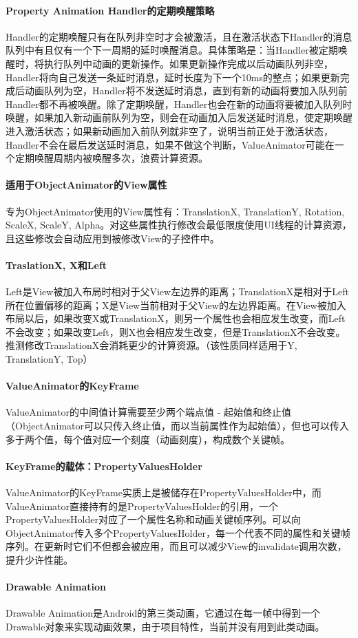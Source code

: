 \documentclass[UTF8]{ctexart}
\begin{document}
    \paragraph{Property Animation Handler的定期唤醒策略}
    Handler的定期唤醒只有在队列非空时才会被激活，且在激活状态下Handler的消息队列中有且仅有一个下一周期的延时唤醒消息。具体策略是：当Handler被定期唤醒时，将执行队列中动画的更新操作。如果更新操作完成以后动画队列非空，Handler将向自己发送一条延时消息，延时长度为下一个10ms的整点；如果更新完成后动画队列为空，Handler将不发送延时消息，直到有新的动画将要加入队列前Handler都不再被唤醒。除了定期唤醒，Handler也会在新的动画将要被加入队列时唤醒，如果加入新动画前队列为空，则会在动画加入后发送延时消息，使定期唤醒进入激活状态；如果新动画加入前队列就非空了，说明当前正处于激活状态，Handler不会在最后发送延时消息，如果不做这个判断，ValueAnimator可能在一个定期唤醒周期内被唤醒多次，浪费计算资源。
    \paragraph{适用于ObjectAnimator的View属性}
    专为ObjectAnimator使用的View属性有：TranslationX, TranslationY, Rotation, ScaleX, ScaleY, Alpha。对这些属性执行修改会最低限度使用UI线程的计算资源，且这些修改会自动应用到被修改View的子控件中。
    \paragraph{TraslationX, X和Left}
    Left是View被加入布局时相对于父View左边界的距离；TranslationX是相对于Left所在位置偏移的距离；X是View当前相对于父View的左边界距离。在View被加入布局以后，如果改变X或TranslationX，则另一个属性也会相应发生改变，而Left不会改变；如果改变Left，则X也会相应发生改变，但是TranslationX不会改变。推测修改TranslationX会消耗更少的计算资源。（该性质同样适用于Y, TranslationY, Top）
    \paragraph{ValueAnimator的KeyFrame}
    ValueAnimator的中间值计算需要至少两个端点值 - 起始值和终止值（ObjectAnimator可以只传入终止值，而以当前属性作为起始值），但也可以传入多于两个值，每个值对应一个刻度（动画刻度），构成数个关键帧。
    \paragraph{KeyFrame的载体：PropertyValuesHolder}
    ValueAnimator的KeyFrame实质上是被储存在PropertyValuesHolder中，而ValueAnimator直接持有的是PropertyValuesHolder的引用，一个PropertyValuesHolder对应了一个属性名称和动画关键帧序列。可以向ObjectAnimator传入多个PropertyValuesHolder，每一个代表不同的属性和关键帧序列。在更新时它们不但都会被应用，而且可以减少View的invalidate调用次数，提升少许性能。
    \paragraph{Drawable Animation}
    Drawable Animation是Android的第三类动画，它通过在每一帧中得到一个Drawable对象来实现动画效果，由于项目特性，当前并没有用到此类动画。
\end{document}
